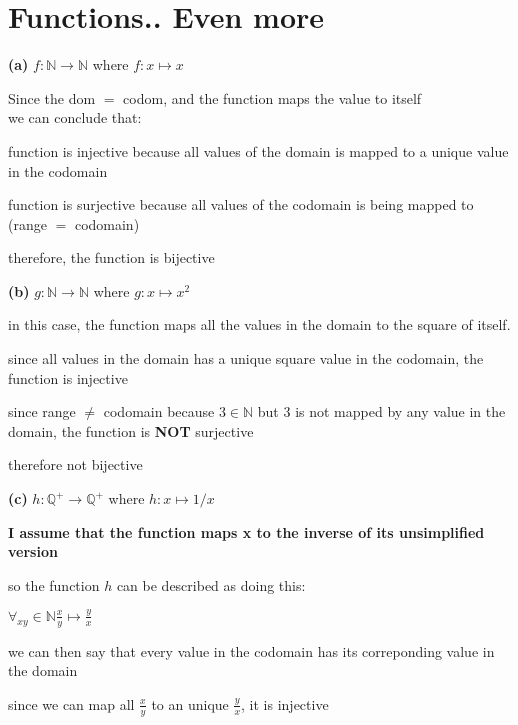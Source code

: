 \documentclass[12pts,A4]{article}
\begin{document}
\section{ Functions.. Even more}

\begin{flushleft}
    \textbf{(a)} $f: \mathbb{N} \rightarrow \mathbb{N}$ where $ f: x \mapsto x$
    
    \bigskip 

    Since the dom $=$ codom, and the function maps the value to itself\\
    we can conclude that:
    
    \bigskip
    
    function is injective because all values of the domain is mapped to a unique value in the codomain 
    
    function is surjective because all values of the codomain is being mapped to
    (range $=$ codomain)

    therefore, the function is bijective

    \bigskip



    \textbf{(b)} $g: \mathbb{N} \rightarrow \mathbb{N}$ where $ g: x \mapsto x^{2}$

    in this case, the function maps all the values in the domain to the square of itself.

    since all values in the domain has a unique square value in the codomain, the function is injective

    since range $\not =$ codomain because $ 3 \in \mathbb{N}$ but 3 is not mapped by any value in the domain, the function is \textbf{NOT} surjective

    therefore not bijective 

    \bigskip

    \textbf{(c)} $h: \mathbb{Q^{+}} \rightarrow \mathbb{Q^{+}}$ where $ h: x \mapsto 1/x$
    
    \textbf{ I assume that the function maps x to the inverse of its unsimplified version} 
    
    so the function $h$ can be described as doing this:

    $\forall_{x y} \in \mathbb{N} \frac{x}{y} \mapsto \frac{y}{x}$
    \bigskip

    we can then say that every value in the codomain has its correponding value in the domain

    since we can map all $\frac{x}{y}$ to an unique $\frac{y}{x}$, it is injective


\end{flushleft}
\end{document}
